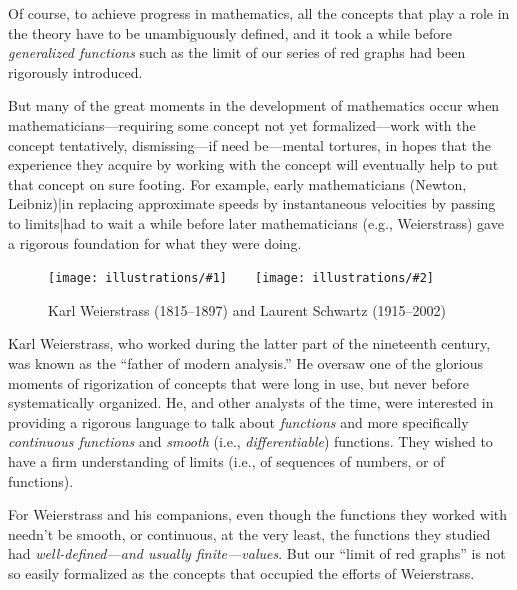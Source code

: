 \documentclass[openany]{book}
\newcommand{\illtwo}[4]{%
   \begin{figure}[H]\centering%
   \texttt{[image: illustrations/\#1]}$\qquad$\texttt{[image: illustrations/\#2]}%
   \caption{#4}%
    \end{figure}}
\theoremstyle{plain}
\theoremstyle{definition}
\begin{document}
{   Of course, to achieve progress in mathematics, all the concepts
   that play a role in the theory have to be unambiguously defined,
   and it took a while before {\it generalized functions} such as the
   limit of our series of red graphs had been rigorously introduced.

   But many of the great moments in the development of mathematics
   occur when mathematicians---requiring some concept not yet
   formalized---work with the concept tentatively, dismissing---if
   need be---mental tortures, in hopes that the experience they
   acquire by working with the concept will eventually help to put
   that concept on sure footing. For example, early mathematicians
   (Newton, Leibniz)|in replacing approximate speeds by instantaneous
   velocities by passing to limits|had to wait a while before later
   mathematicians (e.g., Weierstrass) gave a rigorous foundation for
   what they were doing.



 \illtwo{weierstrass}{schwartz}{.3}{Karl Weierstrass (1815--1897) and Laurent Schwartz (1915--2002)\index{Schwartz, Laurent}}

 Karl Weierstrass, who worked during the latter part of the nineteenth
 century, was known as the ``father of modern analysis.'' He oversaw
 one of the glorious moments of rigorization of concepts that were
 long in use, but never before systematically organized.  He, and
 other analysts of the time, were interested in providing a rigorous
 language to talk about {\it functions} and more specifically {\it
   continuous functions} and {\it smooth} (i.e., {\it differentiable})
 functions. They wished to have a firm understanding of limits (i.e.,
 of sequences of numbers, or of functions).


 For Weierstrass and his companions, even though the functions they
 worked with needn't be smooth, or continuous, at the very least, the
 functions they studied had {\it well-defined---and usually
   finite---values}.  But our ``limit of red graphs'' is not so easily
 formalized as the concepts that occupied the efforts of
 Weierstrass.

}
\end{document}
